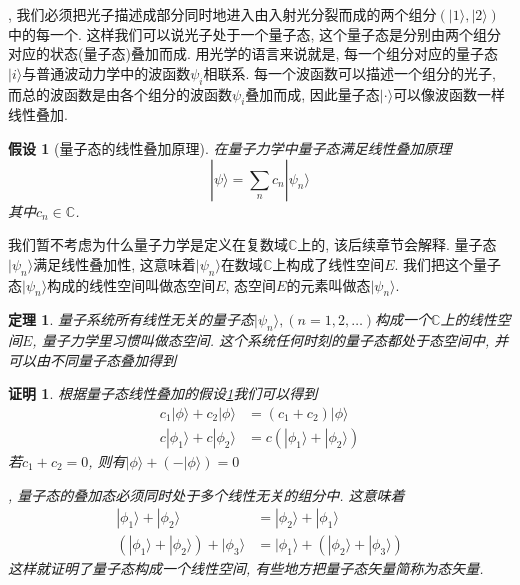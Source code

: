 \documentclass[a4paper,11pt]{article}
\theoremstyle{mystyle}
\newtheorem{theorem}{\hspace{2em}定理}[section]
\newtheorem{Proof}{\hspace{2em}证明}[section]
\newtheorem{hypothesis}{\hspace{2em}假设}[section]
\begin{document}
, 我们必须把光子描述成部分同时地进入由入射光分裂而成的两个组分$(|1\rangle,|2\rangle)$中的每一个. 这样我们可以说光子处于一个量子态, 这个量子态是分别由两个组分对应的状态(量子态)叠加而成. 用光学的语言来说就是, 每一个组分对应的量子态$|i\rangle$与普通波动力学中的波函数$\psi_i$相联系. 每一个波函数可以描述一个组分的光子, 而总的波函数是由各个组分的波函数$\psi_i$叠加而成, 因此量子态$|\cdot\rangle$可以像波函数一样线性叠加.

\begin{hypothesis}[量子态的线性叠加原理]\label{Superposition hypothesis}
  在量子力学中量子态满足线性叠加原理
\begin{equation*}
  |\psi\rangle=\sum_{n}c_n|\psi_n\rangle
\end{equation*}
其中$c_n\in\mathbb{C}$.
\end{hypothesis}
我们暂不考虑为什么量子力学是定义在复数域$\mathbb{C}$上的, 该后续章节会解释. 量子态$|\psi_n\rangle$满足线性叠加性, 这意味着$|\psi_n\rangle$在数域$\mathbb{C}$上构成了线性空间$E$. 我们把这个量子态$|\psi_n\rangle$构成的线性空间叫做态空间$E$, 态空间$E$的元素叫做态$|\psi_n\rangle$.
\begin{theorem}
  量子系统所有线性无关的量子态$|\psi_n\rangle,(n=1,2,\dots)$构成一个$\mathbb{C}$上的线性空间$E$, 量子力学里习惯叫做态空间. 这个系统任何时刻的量子态都处于态空间中, 并可以由不同量子态叠加得到
\end{theorem}
\begin{Proof}
  根据量子态线性叠加的假设\ref{Superposition hypothesis}我们可以得到
\begin{equation*}
  \begin{split}
     c_1|\phi\rangle+c_2|\phi\rangle&=(c_1+c_2)|\phi\rangle \\
     c|\phi_1\rangle+c|\phi_2\rangle&=c(|\phi_1\rangle+|\phi_2\rangle)
  \end{split}
\end{equation*}
若$c_1+c_2=0$, 则有$|\phi\rangle+(-|\phi\rangle)=0$

, 量子态的叠加态必须同时处于多个线性无关的组分中. 这意味着
\begin{equation*}
  \begin{split}
     |\phi_1\rangle+|\phi_2\rangle&=|\phi_2\rangle+|\phi_1\rangle\\
     (|\phi_1\rangle+|\phi_2\rangle)+|\phi_3\rangle&=|\phi_1\rangle+(|\phi_2\rangle+|\phi_3\rangle)
  \end{split}
\end{equation*}
这样就证明了量子态构成一个线性空间, 有些地方把量子态矢量简称为态矢量.
\end{Proof}
\end{document}
